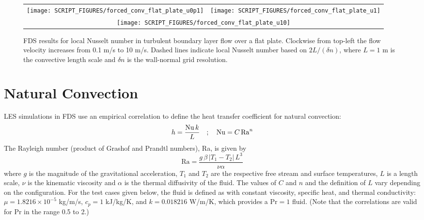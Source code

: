 \documentclass[11pt]{book}
\begin{document}
\begin{figure}[h]
   \begin{tabular*}{\textwidth}{lr}
      \texttt{[image: SCRIPT\_FIGURES/forced\_conv\_flat\_plate\_u0p1]} &
      \texttt{[image: SCRIPT\_FIGURES/forced\_conv\_flat\_plate\_u1]}   \\
      \multicolumn{2}{c}{\texttt{[image: SCRIPT\_FIGURES/forced\_conv\_flat\_plate\_u10]}}
   \end{tabular*}
   \caption[Nusselt correlation local turbulent flat plate]{\label{fig_forced_conv_flat_plate} FDS results for local Nusselt number in turbulent boundary layer flow over a flat plate.  Clockwise from top-left the flow velocity increases from 0.1 m/s to 10 m/s.  Dashed lines indicate local Nusselt number based on $2L/(\delta n)$, where $L=1$ m is the convective length scale and $\delta n$ is the wall-normal grid resolution.}
\end{figure}


\clearpage

\section{Natural Convection}

LES simulations in FDS use an empirical correlation to define the heat transfer coefficient for natural convection:
\begin{equation}
  h = \frac{{\rm Nu} \, k}{L} \quad ; \quad \mathrm{Nu} = C \,\mathrm{Ra}^n
\end{equation}
The Rayleigh number (product of Grashof and Prandtl numbers), Ra, is given by
\begin{equation}
\label{eq:rayleigh_number}
\mathrm{Ra} = \frac{g \, \beta \, |T_1-T_2| \, L^3}{\nu\alpha}
\end{equation}
where $g$ is the magnitude of the gravitational acceleration, $T_1$ and $T_2$ are the respective free stream and surface temperatures, $L$ is a length scale, $\nu$ is the kinematic viscosity and $\alpha$ is the thermal diffusivity of the fluid. The values of $C$ and $n$ and the definition of $L$ vary depending on the configuration. For the test cases given below, the fluid is defined as  with constant viscosity, specific heat, and thermal conductivity: $\mu = 1.8216 \times 10^{-5}$ \si{kg/m/s}, $c_p = 1$ \si{kJ/kg/K}, and $k = 0.018216$ \si{W/m/K}, which provides a $\mathrm{Pr}=1$ fluid. (Note that the correlations are valid for Pr in the range 0.5 to 2.)
\end{document}
